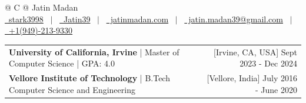 \documentclass[a4paper,3pt]{article}
\begin{document}
\pagestyle{empty}


\begin{tabularx}{\linewidth}{@{} C @{}}
    \Huge{Jatin Madan}                                                           \\[10.5pt]
    \href{https://github.com/stark3998}{\raisebox{-0.05\height}\faGithub\ stark3998} \ $|$ \
    \href{https://linkedin.com/in/jatin39}{\raisebox{-0.05\height}\faLinkedin\ Jatin39} \ $|$ \
    \href{https://jatinmadan.com}{\raisebox{-0.05\height}\faGlobe \ jatinmadan.com} \ $|$ \
    \href{mailto:jatin.madan39@gmail.com}{\raisebox{-0.05\height}\faEnvelope \ jatin.madan39@gmail.com} \ $|$ \
    \href{tel:+19492139330}{\raisebox{-0.05\height}\faMobile \ +1(949)-213-9330} \\
\end{tabularx}

\begin{tabularx}{\linewidth}{ @{}l r@{} }
    \textbf{University of California, Irvine} | Master of Computer Science | GPA: 4.0            & \hfill [Irvine, CA, USA] Sept 2023 - Dec 2024 \\[2pt]
    \textbf{Vellore Institute of Technology} | B.Tech Computer Science and Engineering & \hfill [Vellore, India] July 2016 - June 2020 \\[2pt]
\end{tabularx}
\end{document}
